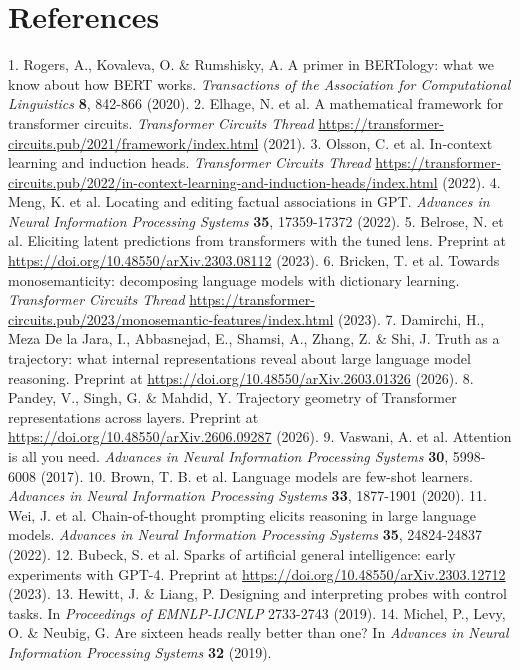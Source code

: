 \documentclass[12pt]{article}
\begin{document}
\section*{References}
1. Rogers, A., Kovaleva, O. \& Rumshisky, A. A primer in BERTology: what we know about how BERT works. \emph{Transactions of the Association for Computational Linguistics} \textbf{8}, 842-866 (2020).
2. Elhage, N. et al. A mathematical framework for transformer circuits. \emph{Transformer Circuits Thread} \url{https://transformer-circuits.pub/2021/framework/index.html} (2021).
3. Olsson, C. et al. In-context learning and induction heads. \emph{Transformer Circuits Thread} \url{https://transformer-circuits.pub/2022/in-context-learning-and-induction-heads/index.html} (2022).
4. Meng, K. et al. Locating and editing factual associations in GPT. \emph{Advances in Neural Information Processing Systems} \textbf{35}, 17359-17372 (2022).
5. Belrose, N. et al. Eliciting latent predictions from transformers with the tuned lens. Preprint at \url{https://doi.org/10.48550/arXiv.2303.08112} (2023).
6. Bricken, T. et al. Towards monosemanticity: decomposing language models with dictionary learning. \emph{Transformer Circuits Thread} \url{https://transformer-circuits.pub/2023/monosemantic-features/index.html} (2023).
7. Damirchi, H., Meza De la Jara, I., Abbasnejad, E., Shamsi, A., Zhang, Z. \& Shi, J. Truth as a trajectory: what internal representations reveal about large language model reasoning. Preprint at \url{https://doi.org/10.48550/arXiv.2603.01326} (2026).
8. Pandey, V., Singh, G. \& Mahdid, Y. Trajectory geometry of Transformer representations across layers. Preprint at \url{https://doi.org/10.48550/arXiv.2606.09287} (2026).
9. Vaswani, A. et al. Attention is all you need. \emph{Advances in Neural Information Processing Systems} \textbf{30}, 5998-6008 (2017).
10. Brown, T. B. et al. Language models are few-shot learners. \emph{Advances in Neural Information Processing Systems} \textbf{33}, 1877-1901 (2020).
11. Wei, J. et al. Chain-of-thought prompting elicits reasoning in large language models. \emph{Advances in Neural Information Processing Systems} \textbf{35}, 24824-24837 (2022).
12. Bubeck, S. et al. Sparks of artificial general intelligence: early experiments with GPT-4. Preprint at \url{https://doi.org/10.48550/arXiv.2303.12712} (2023).
13. Hewitt, J. \& Liang, P. Designing and interpreting probes with control tasks. In \emph{Proceedings of EMNLP-IJCNLP} 2733-2743 (2019).
14. Michel, P., Levy, O. \& Neubig, G. Are sixteen heads really better than one? In \emph{Advances in Neural Information Processing Systems} \textbf{32} (2019).
\end{document}
